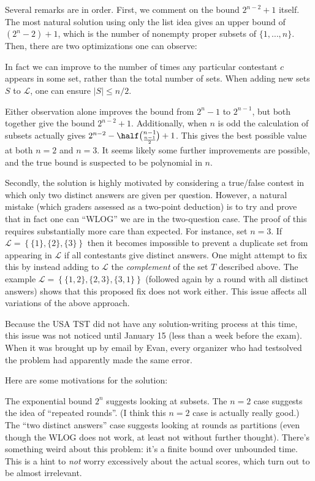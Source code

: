 \documentclass[11pt]{scrartcl}
\begin{document}
\begin{remark*}
Several remarks are in order.
First, we comment on the bound $2^{n-2} + 1$ itself.
The most natural solution using only the
list idea gives an upper bound of $(2^n-2)+1$,
which is the number of nonempty proper subsets of $\{1, \dots, n\}$.
Then, there are two optimizations one can observe:
\begin{itemize}
  \ii In fact we can improve to the number of times
  any particular contestant $c$ appears in some set,
  rather than the total number of sets.
  \ii When adding new sets $S$ to $\mathcal L$, one can ensure $|S| \le n/2$.
\end{itemize}
Either observation alone improves the bound from $2^n-1$ to $2^{n-1}$,
but both together give the bound $2^{n-2} + 1$.
Additionally, when $n$ is odd the calculation of subsets
actually gives $2^{n-2} - \half \binom{n-1}{\frac{n-1}{2}} + 1$.
This gives the best possible value at both $n=2$ and $n=3$.
It seems likely some further improvements are possible,
and the true bound is suspected to be polynomial in $n$.

Secondly, the solution is highly motivated by considering a true/false contest
in which only two distinct answers are given per question.
However, a natural mistake (which graders assessed as a two-point deduction)
is to try and prove that in fact
one can ``WLOG'' we are in the two-question case.
The proof of this requires substantially more care than expected.
For instance, set $n = 3$.
If $\mathcal L = \left\{ \{1\}, \{2\}, \{3\}  \right\}$
then it becomes impossible to prevent a duplicate set from appearing
in $\mathcal L$ if all contestants give distinct answers.
One might attempt to fix this by instead adding to $\mathcal L$
the \emph{complement} of the set $T$ described above.
The example $\mathcal L = \left\{ \{1,2\}, \{2,3\}, \{3,1\}  \right\}$
(followed again by a round with all distinct answers)
shows that this proposed fix does not work either.
This issue affects all variations of the above approach.

Because the USA TST did not have any solution-writing process at this time,
this issue was not noticed until January 15 (less than a week before the exam).
When it was brought up by email by Evan,
every organizer who had testsolved the problem had apparently made the same error.
\end{remark*}
\begin{remark*}
  Here are some motivations for the solution:
  \begin{enumerate}
    \ii The exponential bound $2^n$ suggests looking at subsets.
    \ii The $n = 2$ case suggests the idea of ``repeated rounds''.
    (I think this $n=2$ case is actually really good.)
    \ii The ``two distinct answers'' case suggests looking at rounds
    as partitions (even though the WLOG does not work,
    at least not without further thought).
    \ii There's something weird about this problem:
    it's a finite bound over unbounded time.
    This is a hint to \emph{not} worry excessively about
    the actual scores, which turn out to be almost irrelevant.
  \end{enumerate}
\end{remark*}
\pagebreak
\end{document}
